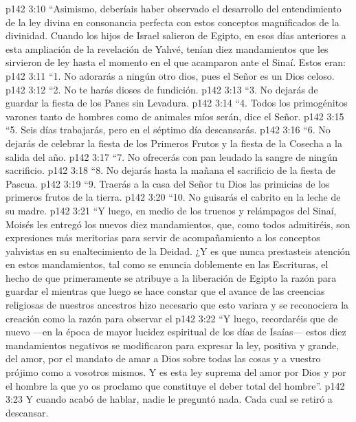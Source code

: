 \vs p142 3:10 “Asimismo, deberíais haber observado el desarrollo del entendimiento de la ley divina en consonancia perfecta con estos conceptos magnificados de la divinidad. Cuando los hijos de Israel salieron de Egipto, en esos días anteriores a esta ampliación de la revelación de Yahvé, tenían diez mandamientos que les sirvieron de ley hasta el momento en el que acamparon ante el Sinaí. Estos eran:
\vs p142 3:11 “1. No adorarás a ningún otro dios, pues el Señor es un Dios celoso.
\vs p142 3:12 “2. No te harás dioses de fundición.
\vs p142 3:13 “3. No dejarás de guardar la fiesta de los Panes sin Levadura.
\vs p142 3:14 “4. Todos los primogénitos varones tanto de hombres como de animales míos serán, dice el Señor.
\vs p142 3:15 “5. Seis días trabajarás, pero en el séptimo día descansarás.
\vs p142 3:16 “6. No dejarás de celebrar la fiesta de los Primeros Frutos y la fiesta de la Cosecha a la salida del año.
\vs p142 3:17 “7. No ofrecerás con pan leudado la sangre de ningún sacrificio.
\vs p142 3:18 “8. No dejarás hasta la mañana el sacrificio de la fiesta de Pascua.
\vs p142 3:19 “9. Traerás a la casa del Señor tu Dios las primicias de los primeros frutos de la tierra.
\vs p142 3:20 “10. No guisarás el cabrito en la leche de su madre.
\vs p142 3:21 \pc “Y luego, en medio de los truenos y relámpagos del Sinaí, Moisés les entregó los nuevos diez mandamientos, que, como todos admitiréis, son expresiones más meritorias para servir de acompañamiento a los conceptos yahvistas en su enaltecimiento de la Deidad. ¿Y es que nunca prestasteis atención en estos mandamientos, tal como se enuncia doblemente en las Escrituras, el hecho de que primeramente se atribuye a la liberación de Egipto la razón para guardar el  mientras que luego se hace constar que el avance de las creencias religiosas de nuestros ancestros hizo necesario que esto variara y se reconociera la creación como la razón para observar el 
\vs p142 3:22 “Y luego, recordaréis que de nuevo ---en la época de mayor lucidez espiritual de los días de Isaías--- estos diez mandamientos negativos se modificaron para expresar la ley, positiva y grande, del amor, por el mandato de amar a Dios sobre todas las cosas y a vuestro prójimo como a vosotros mismos. Y es esta ley suprema del amor por Dios y por el hombre la que yo os proclamo que constituye el deber total del hombre”.
\vs p142 3:23 \pc Y cuando acabó de hablar, nadie le preguntó nada. Cada cual se retiró a descansar.
